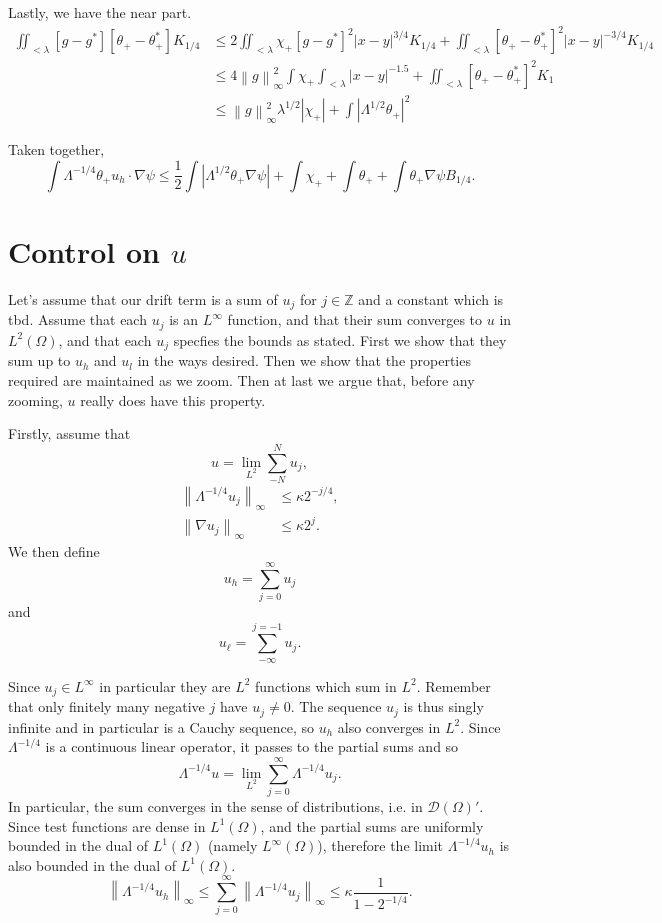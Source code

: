 \documentclass[11pt]{amsart}
\theoremstyle{remark}
\newcommand{\Z}{\mathbb{Z}}
\newcommand{\norm}[1]{\left\lVert#1\right\rVert}
\newcommand{\abs}[1]{\left\lvert #1 \right\rvert}
\newcommand{\grad}{\nabla}
\newcommand{\test}{\mathcal{D}}
\begin{document}
Lastly, we have the near part.  
\begin{align*} 
\iint_{< \lambda} [g-g^*][\theta_+ - \theta_+^*] K_{1/4} &\leq 2\iint_{<\lambda} \chi_+ [g-g^*]^2 |x-y|^{3/4} K_{1/4} + \iint_{<\lambda} [\theta_+-\theta_+^*]^2 |x-y|^{-3/4} K_{1/4} 
\\ &\leq 4 \norm{g}_\infty^2 \int \chi_+ \int_{<\lambda} |x-y|^{-1.5} + \iint_{<\lambda} [\theta_+-\theta_+^*]^2 K_1
\\ &\leq \norm{g}_\infty^2 \lambda^{1/2} \abs{\chi_+} + \int \abs{\Lambda^{1/2} \theta_+}^2
\end{align*}

Taken together,
\[ \int \Lambda^{-1/4} \theta_+ u_h \cdot \grad \psi \leq \frac{1}{2} \int \abs{\Lambda^{1/2} \theta_+ \grad \psi} + \int \chi_+ + \int \theta_+ + \int \theta_+ \grad \psi B_{1/4}. \]


\section{Control on $u$}
Let's assume that our drift term is a sum of $u_j$ for $j \in \Z$ and a constant which is tbd.  Assume that each $u_j$ is an $L^\infty$ function, and that their sum converges to $u$ in $L^2(\Omega)$, and that each $u_j$ specfies the bounds as stated.  First we show that they sum up to $u_h$ and $u_l$ in the ways desired.  Then we show that the properties required are maintained as we zoom.  Then at last we argue that, before any zooming, $u$ really does have this property.  

Firstly, assume that 
\[ u = \lim_{L^2} \sum_{-N}^N u_j, \]
\begin{align*} 
\norm{\Lambda^{-1/4} u_j}_\infty &\leq \kappa 2^{-j/4}, \\
\norm{\grad u_j}_\infty &\leq \kappa 2^j. 
\end{align*}
We then define
\[ u_h = \sum_{j=0}^\infty u_j \]
and 
\[ u_\ell = \sum_{-\infty}^{j=-1} u_j. \]

Since $u_j \in L^\infty$ in particular they are $L^2$ functions which sum in $L^2$.  Remember that only finitely many negative $j$ have $u_j \neq 0$.  The sequence $u_j$ is thus singly infinite and in particular is a Cauchy sequence, so $u_h$ also converges in $L^2$.  Since $\Lambda^{-1/4}$ is a continuous linear operator, it passes to the partial sums and so
\[ \Lambda^{-1/4} u = \lim_{L^2} \sum_{j=0}^\infty \Lambda^{-1/4} u_j. \]
In particular, the sum converges in the sense of distributions, i.e. in $\test(\Omega)'$.  Since test functions are dense in $L^1(\Omega)$, and the partial sums are uniformly bounded in the dual of $L^1(\Omega)$ (namely $L^\infty(\Omega)$), therefore the limit $\Lambda^{-1/4} u_h$ is also bounded in the dual of $L^1(\Omega)$.  
\[ \norm{\Lambda^{-1/4} u_h}_\infty \leq \sum_{j=0}^\infty \norm{\Lambda^{-1/4} u_j}_\infty \leq \kappa \frac{1}{1-2^{-1/4}}. \]
\end{document}
